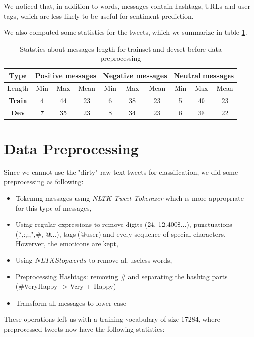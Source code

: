 \documentclass[a4paper,english,12pt]{article}
\begin{document}
We noticed that, in addition to words, messages contain hashtags, URLs and user tags, which are less likely to be useful for sentiment prediction. 

We also computed some statistics for the tweets, which we summarize in table \ref{stat}.


\begin{table}[H]\centering
	\begin{tabular}{|c|c c c|c c c|c c c|}
		\hline \textbf{Type}  & \multicolumn{3}{|c|}{\textbf{Positive messages}} & \multicolumn{3}{|c|}{\textbf{Negative messages}} & \multicolumn{3}{|c|}{\textbf{Neutral messages}}\\    \hline
		 Length & Min & Max & Mean & Min & Max & Mean & Min & Max & Mean\\   \hline
		\textbf{Train} & 4&44&23&6&38&23&5&40&23 \\
		\textbf{Dev} & 7&35&23&8&34&23&6&38&22 \\
		\hline
	\end{tabular}
	\caption{Statstics about messages length for trainset and devset before data preprocessing}
	\label{stat}
\end{table}


\section{Data Preprocessing}
Since we cannot use the "dirty" raw text tweets for classification, we did some preprocessing as following:
\begin{itemize}
	\item Tokening messages using \emph{NLTK Tweet Tokenizer} which is more appropriate for this type of messages,
	\item Using regular expressions to remove digits (24, 12.400\$...), punctuations (?,:,;,",\#, @...), tags (@user) and every sequence of special characters. Howerver, the emoticons are kept,
	\item Using $NLTK Stop words$ to remove all useless words,
	\item Preprocessing Hashtags: removing \# and separating the hashtag parts (\#VeryHappy -> Very + Happy)
	\item Transform all messages to lower case. 
\end{itemize}

These operations left us with a training vocabulary of size 17284, where preprocessed tweets now have the following statistics:
\end{document}
